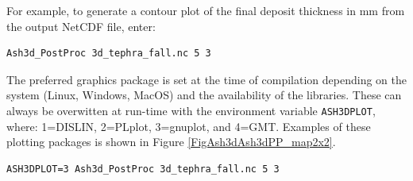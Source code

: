 \normalsize
For example, to generate a contour plot of the final deposit thickness in $\mathrm{mm}$
from the output NetCDF file, enter:
\small
\begin{verbatim}
Ash3d_PostProc 3d_tephra_fall.nc 5 3
\end{verbatim}
\normalsize

The preferred graphics package is set at the time of compilation depending on the
system (Linux, Windows, MacOS) and the availability of the libraries. These can
always be overwitten at run-time with the environment variable \texttt{ASH3DPLOT},
where: 1=DISLIN, 2=PLplot, 3=gnuplot, and 4=GMT. Examples of these plotting packages
is shown in Figure \ref{FigAsh3dAsh3dPP_map2x2}.

\small
\begin{verbatim}
ASH3DPLOT=3 Ash3d_PostProc 3d_tephra_fall.nc 5 3
\end{verbatim}
\normalsize

